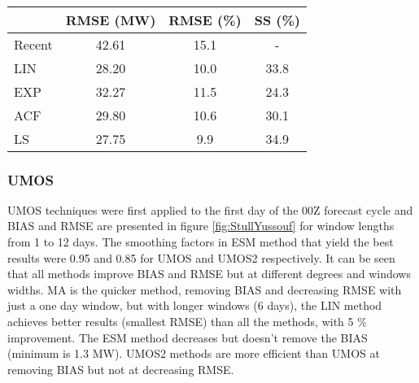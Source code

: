 \begin{figure}[!htp]
    \centering
    \\
    \label{fig:decerr_st}
\end{figure}
\FloatBarrier


\begin{table}[!htp]
\small
\centering
{}
\label{tb:sum_st}
\begin{tabular}{lccc}
    \toprule
            &	RMSE (MW)	&	RMSE (\%)	&	SS (\%)	\\
    \midrule
    Recent	&	42.61	&	15.1	&	-	\\
    LIN	    &	28.20	&	10.0	&	33.8	\\
    EXP	    &	32.27	&	11.5	&	24.3	\\
    ACF	    &	29.80	&	10.6	&	30.1	\\
    LS	    &	27.75	&	9.9     &	34.9	\\
    \bottomrule
\end{tabular}
\end{table}
\FloatBarrier

\FloatBarrier
\subsubsection{UMOS}

UMOS techniques were first applied to the first day of the 00Z forecast cycle and BIAS and RMSE are presented in figure \ref{fig:StullYussouf} for window lengths from 1 to 12 days. The smoothing factors in ESM method that yield the best results were 0.95 and 0.85 for UMOS and UMOS2 respectively. It can be seen that all methods improve BIAS and RMSE but at different degrees and windows widths. MA is the quicker method, removing BIAS and decreasing RMSE with just a one day window, but with longer windows (6 days), the LIN method achieves better results (smallest RMSE) than all the methods, with 5 \% improvement. The ESM method decreases but doesn't remove the BIAS (minimum is 1.3 MW). UMOS2 methods are more efficient than UMOS at removing BIAS but not at decreasing RMSE. 

